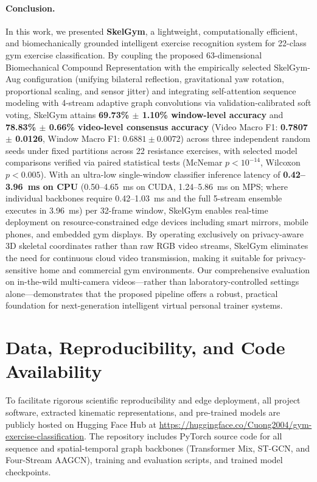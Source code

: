 \documentclass[runningheads]{llncs}
\begin{document}
\paragraph{Conclusion.} In this work, we presented \textbf{SkelGym}, a lightweight, computationally efficient, and biomechanically grounded intelligent exercise recognition system for 22-class gym exercise classification. By coupling the proposed 63-dimensional Biomechanical Compound Representation with the empirically selected SkelGym-Aug configuration (unifying bilateral reflection, gravitational yaw rotation, proportional scaling, and sensor jitter) and integrating self-attention sequence modeling with 4-stream adaptive graph convolutions via validation-calibrated soft voting, SkelGym attains \textbf{69.73\% $\pm$ 1.10\% window-level accuracy} and \textbf{78.83\% $\pm$ 0.66\% video-level consensus accuracy} (Video Macro F1: \textbf{0.7807 $\pm$ 0.0126}, Window Macro F1: $0.6881 \pm 0.0072$) across three independent random seeds under fixed partitions across 22 resistance exercises, with selected model comparisons verified via paired statistical tests (McNemar $p < 10^{-14}$, Wilcoxon $p < 0.005$). With an ultra-low single-window classifier inference latency of \textbf{0.42--3.96~ms on CPU} (0.50--4.65~ms on CUDA, 1.24--5.86~ms on MPS; where individual backbones require 0.42--1.03~ms and the full 5-stream ensemble executes in 3.96~ms) per 32-frame window, SkelGym enables real-time deployment on resource-constrained edge devices including smart mirrors, mobile phones, and embedded gym displays. By operating exclusively on privacy-aware 3D skeletal coordinates rather than raw RGB video streams, SkelGym eliminates the need for continuous cloud video transmission, making it suitable for privacy-sensitive home and commercial gym environments. Our comprehensive evaluation on in-the-wild multi-camera videos---rather than laboratory-controlled settings alone---demonstrates that the proposed pipeline offers a robust, practical foundation for next-generation intelligent virtual personal trainer systems.

\section*{Data, Reproducibility, and Code Availability}
To facilitate rigorous scientific reproducibility and edge deployment, all project software, extracted kinematic representations, and pre-trained models are publicly hosted on Hugging Face Hub at \url{https://huggingface.co/Cuong2004/gym-exercise-classification}. The repository includes PyTorch source code for all sequence and spatial-temporal graph backbones (Transformer Mix, ST-GCN, and Four-Stream AAGCN), training and evaluation scripts, and trained model checkpoints. 
\end{document}
